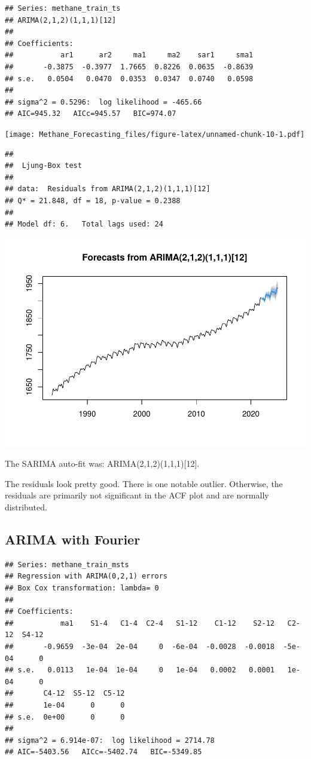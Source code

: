 \documentclass[
]{article}
\begin{document}
\begin{verbatim}
## Series: methane_train_ts 
## ARIMA(2,1,2)(1,1,1)[12] 
## 
## Coefficients:
##           ar1      ar2     ma1     ma2    sar1     sma1
##       -0.3875  -0.3977  1.7665  0.8226  0.0635  -0.8639
## s.e.   0.0504   0.0470  0.0353  0.0347  0.0740   0.0598
## 
## sigma^2 = 0.5296:  log likelihood = -465.66
## AIC=945.32   AICc=945.57   BIC=974.07
\end{verbatim}

\texttt{[image: Methane\_Forecasting\_files/figure-latex/unnamed-chunk-10-1.pdf]}

\begin{verbatim}
## 
##  Ljung-Box test
## 
## data:  Residuals from ARIMA(2,1,2)(1,1,1)[12]
## Q* = 21.848, df = 18, p-value = 0.2388
## 
## Model df: 6.   Total lags used: 24
\end{verbatim}

\includegraphics{Methane_Forecasting_files/figure-latex/unnamed-chunk-10-2.pdf}

The SARIMA auto-fit was: ARIMA(2,1,2)(1,1,1){[}12{]}.

The residuals look pretty good. There is one notable outlier. Otherwise,
the residuals are primarily not significant in the ACF plot and are
normally distributed.

\subsection{ARIMA with Fourier}\label{arima-with-fourier}

\begin{verbatim}
## Series: methane_train_msts 
## Regression with ARIMA(0,2,1) errors 
## Box Cox transformation: lambda= 0 
## 
## Coefficients:
##           ma1    S1-4   C1-4  C2-4   S1-12    C1-12    S2-12   C2-12  S4-12
##       -0.9659  -3e-04  2e-04     0  -6e-04  -0.0028  -0.0018  -5e-04      0
## s.e.   0.0113   1e-04  1e-04     0   1e-04   0.0002   0.0001   1e-04      0
##       C4-12  S5-12  C5-12
##       1e-04      0      0
## s.e.  0e+00      0      0
## 
## sigma^2 = 6.914e-07:  log likelihood = 2714.78
## AIC=-5403.56   AICc=-5402.74   BIC=-5349.85
\end{verbatim}
\end{document}
